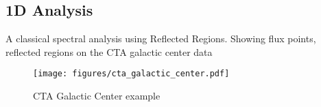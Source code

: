 \subsection{1D Analysis}
\label{ssec:1d-analysis}
A classical spectral analysis using Reflected Regions. Showing flux points,
reflected regions on the CTA galactic center data

\begin{figure*}[t]
	\centering
	\texttt{[image: figures/cta\_galactic\_center.pdf]}
	\caption{CTA Galactic Center example}
	\label{fig:cta_galactic_center}
\end{figure*}

